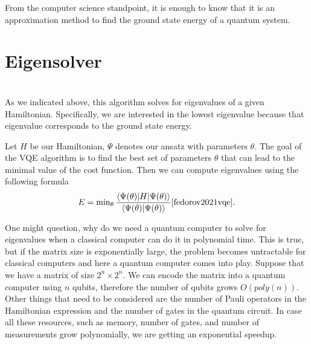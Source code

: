 From the computer science standpoint, it is enough to know that it is an approximation method to find the ground state energy of a quantum system.

\section{Eigensolver}
\\
As we indicated above, this algorithm solves for eigenvalues of a given Hamiltonian. Specifically, we are interested in the lowest eigenvalue because that eigenvalue corresponds to the ground state energy. 

Let $H$ be our Hamiltonian, $\Psi$ denotes our ansatz with parameters $\theta$. The goal of the VQE algorithm is to find the best set of parameters $\theta$ that can lead to the minimal value of the cost function. Then we can compute eigenvalues using the following formula 
\begin{equation} \label{eq:cost-function}
E = \min\nolimits_{\theta} \frac{\langle\Psi(\theta)\rvert H\lvert\Psi(\theta)\rangle}{\langle\Psi(\theta)\vert\Psi(\theta)\rangle}\cite{fedorov2021vqe} \text{.}
\end{equation}


One might question, why do we need a quantum computer to solve for eigenvalues when a classical computer can do it in polynomial time. This is true, but if the matrix size is exponentially large, the problem becomes untractable for classical computers and here a quantum computer comes into play. Suppose that we have a matrix of size $2^n \times 2^n$. We can encode the matrix into a quantum computer using $n$ qubits, therefore the number of qubits grows $O(poly(n))$. Other things that need to be considered are the number of Pauli operators in the Hamiltonian expression and the number of gates in the quantum circuit. In case all these resources, such as memory, number of gates, and number of measurements grow polynomially, we are getting an exponential speedup.

